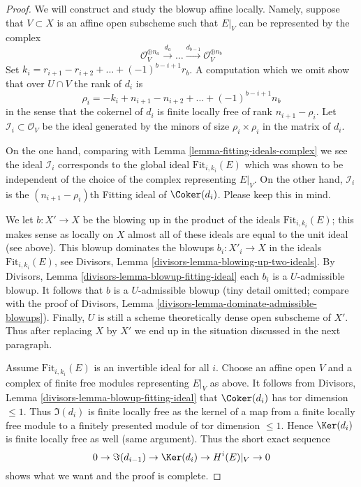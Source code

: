 \begin{proof}
We will construct and study the blowup affine locally. Namely, suppose that
$V \subset X$ is an affine open subscheme such that
$E|_V$ can be represented by the complex
$$
\mathcal{O}_V^{\oplus n_a} \xrightarrow{d_a}
\ldots \xrightarrow{d_{b - 1}} \mathcal{O}_V^{\oplus n_b}
$$
Set $k_ i = r_{i + 1} - r_{i + 2} + \ldots + (-1)^{b - i + 1}r_b$.
A computation which we omit show that over $U \cap V$ the rank of
$d_i$ is
$$
\rho_i = - k_i + n_{i + 1} - n_{i + 2} + \ldots + (-1)^{b - i + 1}n_b
$$
in the sense that the cokernel of $d_i$ is finite locally
free of rank $n_{i + 1} - \rho_i$. Let
$\mathcal{I}_i \subset \mathcal{O}_V$ be the ideal generated by the minors
of size $\rho_i \times \rho_i$ in the matrix of $d_i$.

\medskip\noindent
On the one hand, comparing with Lemma \ref{lemma-fitting-ideals-complex}
we see the ideal $\mathcal{I}_i$ corresponds to the global ideal
$\text{Fit}_{i, k_i}(E)$ which was shown to be
independent of the choice of the complex representing $E|_V$.
On the other hand, $\mathcal{I}_i$ is the $(n_{i + 1} - \rho_i)$th
Fitting ideal of $\Coker(d_i)$. Please keep this in mind.

\medskip\noindent
We let $b : X' \to X$ be the blowing up in the product of the ideals
$\text{Fit}_{i, k_i}(E)$; this makes sense as locally on $X$
almost all of these ideals are equal to the unit ideal (see above).
This blowup dominates the blowups $b_i : X'_i \to X$ in
the ideals $\text{Fit}_{i, k_i}(E)$, see
Divisors, Lemma \ref{divisors-lemma-blowing-up-two-ideals}.
By Divisors, Lemma \ref{divisors-lemma-blowup-fitting-ideal}
each $b_i$ is a $U$-admissible blowup. It follows that
$b$ is a $U$-admissible blowup (tiny detail omitted; compare with
the proof of Divisors, Lemma \ref{divisors-lemma-dominate-admissible-blowups}).
Finally, $U$ is still a scheme theoretically dense open subscheme of $X'$.
Thus after replacing $X$ by $X'$ we end up in the situation
discussed in the next paragraph.

\medskip\noindent
Assume $\text{Fit}_{i, k_i}(E)$ is an invertible ideal for all $i$.
Choose an affine open $V$ and a complex of finite free modules
representing $E|_V$ as above. It follows from
Divisors, Lemma \ref{divisors-lemma-blowup-fitting-ideal}
that $\Coker(d_i)$ has tor dimension $\leq 1$. Thus
$\Im(d_i)$ is finite locally free as the kernel of a map
from a finite locally free module to a finitely presented
module of tor dimension $\leq 1$. Hence $\Ker(d_i)$
is finite locally free as well (same argument). Thus the short
exact sequence
$$
0 \to \Im(d_{i - 1}) \to \Ker(d_i) \to H^i(E)|_V \to 0
$$
shows what we want and the proof is complete.
\end{proof}


